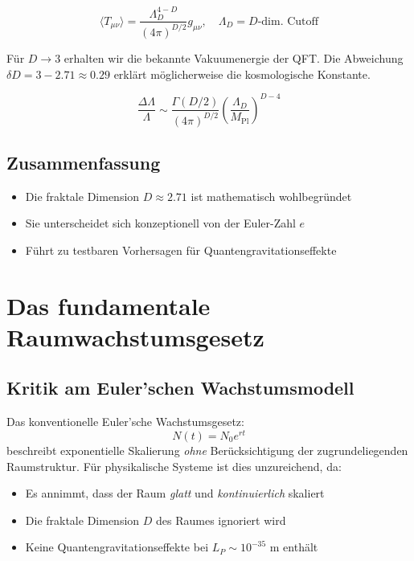 \begin{equation}
\langle T_{\mu\nu}\rangle = \frac{\Lambda_D^{4-D}}{(4\pi)^{D/2}} g_{\mu\nu}, \quad \Lambda_D = D\text{-dim. Cutoff}
\end{equation}

\begin{remark}
Für $D\to 3$ erhalten wir die bekannte Vakuumenergie der QFT. Die Abweichung $\delta D = 3 - 2.71 \approx 0.29$ erklärt möglicherweise die kosmologische Konstante.
\end{remark}

\begin{equation}
\frac{\Delta\Lambda}{\Lambda} \sim \frac{\Gamma(D/2)}{(4\pi)^{D/2}} \left(\frac{\Lambda_D}{M_{\mathrm{Pl}}}\right)^{D-4}
\end{equation}

\subsection*{Zusammenfassung}
\begin{itemize}
\item Die fraktale Dimension $D \approx 2.71$ ist mathematisch wohlbegründet
\item Sie unterscheidet sich konzeptionell von der Euler-Zahl $e$
\item Führt zu testbaren Vorhersagen für Quantengravitationseffekte
\end{itemize}

\section{Das fundamentale Raumwachstumsgesetz}
\label{sec:space_growth_law}

\subsection{Kritik am Euler'schen Wachstumsmodell}
\label{subsec:euler_critique}

Das konventionelle Euler'sche Wachstumsgesetz:
\begin{equation}
N(t) = N_0 e^{rt}
\end{equation}
beschreibt exponentielle Skalierung \textit{ohne} Berücksichtigung der zugrundeliegenden Raumstruktur. Für physikalische Systeme ist dies unzureichend, da:

\begin{itemize}
\item Es annimmt, dass der Raum \textit{glatt} und \textit{kontinuierlich} skaliert
\item Die fraktale Dimension $D$ des Raumes ignoriert wird
\item Keine Quantengravitationseffekte bei $L_P \sim 10^{-35}$ m enthält
\end{itemize}

